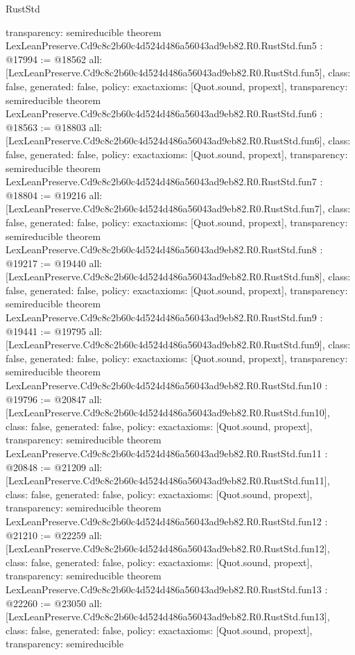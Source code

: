 \begin{lexlean}{RustStd}
\begin{coremodule}
{  transparency: semireducible
}
theorem LexLeanPreserve.Cd9c8c2b60c4d524d486a56043ad9eb82.R0.RustStd.fun5 : @17994 := @18562 {
  all: [LexLeanPreserve.Cd9c8c2b60c4d524d486a56043ad9eb82.R0.RustStd.fun5],
  class: false,
  generated: false,
  policy: exact{axioms: [Quot.sound, propext]},
  transparency: semireducible
}
theorem LexLeanPreserve.Cd9c8c2b60c4d524d486a56043ad9eb82.R0.RustStd.fun6 : @18563 := @18803 {
  all: [LexLeanPreserve.Cd9c8c2b60c4d524d486a56043ad9eb82.R0.RustStd.fun6],
  class: false,
  generated: false,
  policy: exact{axioms: [Quot.sound, propext]},
  transparency: semireducible
}
theorem LexLeanPreserve.Cd9c8c2b60c4d524d486a56043ad9eb82.R0.RustStd.fun7 : @18804 := @19216 {
  all: [LexLeanPreserve.Cd9c8c2b60c4d524d486a56043ad9eb82.R0.RustStd.fun7],
  class: false,
  generated: false,
  policy: exact{axioms: [Quot.sound, propext]},
  transparency: semireducible
}
theorem LexLeanPreserve.Cd9c8c2b60c4d524d486a56043ad9eb82.R0.RustStd.fun8 : @19217 := @19440 {
  all: [LexLeanPreserve.Cd9c8c2b60c4d524d486a56043ad9eb82.R0.RustStd.fun8],
  class: false,
  generated: false,
  policy: exact{axioms: [Quot.sound, propext]},
  transparency: semireducible
}
theorem LexLeanPreserve.Cd9c8c2b60c4d524d486a56043ad9eb82.R0.RustStd.fun9 : @19441 := @19795 {
  all: [LexLeanPreserve.Cd9c8c2b60c4d524d486a56043ad9eb82.R0.RustStd.fun9],
  class: false,
  generated: false,
  policy: exact{axioms: [Quot.sound, propext]},
  transparency: semireducible
}
theorem LexLeanPreserve.Cd9c8c2b60c4d524d486a56043ad9eb82.R0.RustStd.fun10 : @19796 := @20847 {
  all: [LexLeanPreserve.Cd9c8c2b60c4d524d486a56043ad9eb82.R0.RustStd.fun10],
  class: false,
  generated: false,
  policy: exact{axioms: [Quot.sound, propext]},
  transparency: semireducible
}
theorem LexLeanPreserve.Cd9c8c2b60c4d524d486a56043ad9eb82.R0.RustStd.fun11 : @20848 := @21209 {
  all: [LexLeanPreserve.Cd9c8c2b60c4d524d486a56043ad9eb82.R0.RustStd.fun11],
  class: false,
  generated: false,
  policy: exact{axioms: [Quot.sound, propext]},
  transparency: semireducible
}
theorem LexLeanPreserve.Cd9c8c2b60c4d524d486a56043ad9eb82.R0.RustStd.fun12 : @21210 := @22259 {
  all: [LexLeanPreserve.Cd9c8c2b60c4d524d486a56043ad9eb82.R0.RustStd.fun12],
  class: false,
  generated: false,
  policy: exact{axioms: [Quot.sound, propext]},
  transparency: semireducible
}
theorem LexLeanPreserve.Cd9c8c2b60c4d524d486a56043ad9eb82.R0.RustStd.fun13 : @22260 := @23050 {
  all: [LexLeanPreserve.Cd9c8c2b60c4d524d486a56043ad9eb82.R0.RustStd.fun13],
  class: false,
  generated: false,
  policy: exact{axioms: [Quot.sound, propext]},
  transparency: semireducible
}
\end{coremodule}
\end{lexlean}
